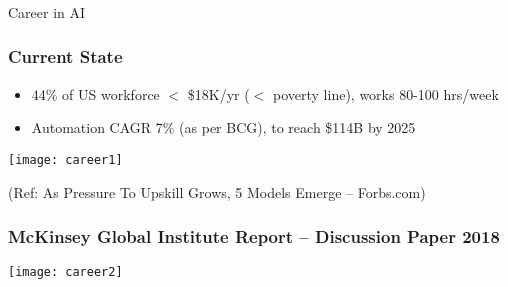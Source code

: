 \begin{frame}[fragile]\frametitle{}
\begin{center}
{\Large Career in AI}
\end{center}
\end{frame}


\begin{frame}[fragile]\frametitle{Current State}
\begin{itemize}
\item 44\% of US workforce $<$ \$18K/yr ($<$ poverty line), works 80-100 hrs/week
\item Automation CAGR 7\% (as per BCG), to reach \$114B by 2025
\end{itemize}

\begin{center}
\texttt{[image: career1]}
\end{center}

{\tiny (Ref: As Pressure To Upskill Grows, 5 Models Emerge – Forbs.com)}
\end{frame}


\begin{frame}[fragile]\frametitle{McKinsey Global Institute Report – Discussion Paper 2018}



\begin{center}
\texttt{[image: career2]}
\end{center}

\end{frame}



